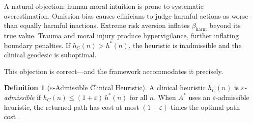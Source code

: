 \documentclass[12pt]{article}
\theoremstyle{definition}
\newtheorem{definition}[theorem]{Definition}
\theoremstyle{remark}
\begin{document}
A natural objection: human moral intuition is prone to systematic overestimation.  Omission bias causes clinicians to judge harmful actions as worse than equally harmful inactions.  Extreme risk aversion inflates $\beta_{\text{harm}}$ beyond its true value.  Trauma and moral injury produce hypervigilance, further inflating boundary penalties.  If $h_C(n) > h^*(n)$, the heuristic is inadmissible and the clinical geodesic is suboptimal.

This objection is correct---and the framework accommodates it precisely.

\begin{definition}[$\varepsilon$-Admissible Clinical Heuristic]
A clinical heuristic $h_C(n)$ is \emph{$\varepsilon$-admissible} if $h_C(n) \leq (1 + \varepsilon)\, h^*(n)$ for all $n$.  When $A^*$ uses an $\varepsilon$-admissible heuristic, the returned path has cost at most $(1 + \varepsilon)$ times the optimal path cost \cite{hart1968}.
\end{definition}
\end{document}
